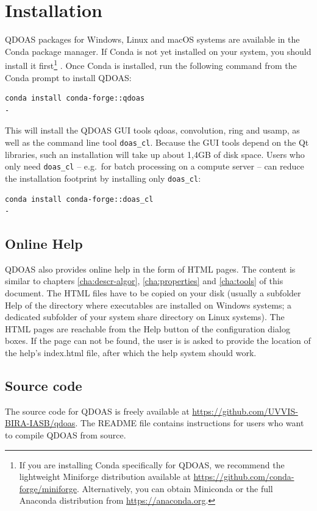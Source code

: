 \section{Installation}
QDOAS packages for Windows, Linux and macOS systems are available in the Conda package manager.  If Conda is not yet installed on your system, you should install it first\footnote{If you are installing Conda specifically for QDOAS, we recommend the lightweight Miniforge distribution available at \url{https://github.com/conda-forge/miniforge}.  Alternatively, you can obtain Miniconda or the full Anaconda distribution from \url{https://anaconda.org}.}
.  Once Conda is installed, run the following command from the Conda prompt to install QDOAS:

\begin{Verbatim}[fontfamily=courier,fontsize=\relsize{-2},xleftmargin=5mm]
conda install conda-forge::qdoas
-\end{Verbatim}

This will install the QDOAS GUI tools qdoas, convolution, ring and usamp, as well as the command line tool \verb|doas_cl|.  Because the GUI tools depend on the Qt libraries, such an installation will take up about 1,4GB of disk space.  Users who only need \verb|doas_cl|  -- e.g.\ for batch processing on a compute server -- can reduce the installation footprint by installing only \verb|doas_cl|:
\begin{Verbatim}[fontfamily=courier,fontsize=\relsize{-2},xleftmargin=5mm]
conda install conda-forge::doas_cl
-\end{Verbatim}

\subsection{Online Help}
QDOAS also provides online help in the form of HTML pages.  The
content is similar to chapters \ref{cha:descr-algor},
\ref{cha:properties} and \ref{cha:tools} of this document.  The HTML
files have to be copied on your disk (usually a subfolder Help of the
directory where executables are installed on Windows systems; a
dedicated subfolder of your system share directory on Linux systems).
The HTML pages are reachable from the Help button of the configuration
dialog boxes.  If the page can not be found, the user is is asked to
provide the location of the help's index.html file, after which the help system should work.

\subsection{Source code}
The source code for QDOAS is freely available at \url{https://github.com/UVVIS-BIRA-IASB/qdoas}.  The README file contains instructions for users who want to compile QDOAS from source.



